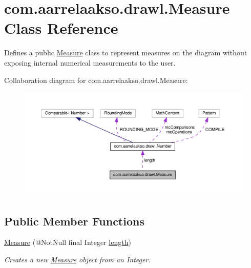 \hypertarget{classcom_1_1aarrelaakso_1_1drawl_1_1_measure}{}\section{com.\+aarrelaakso.\+drawl.\+Measure Class Reference}
\label{classcom_1_1aarrelaakso_1_1drawl_1_1_measure}


Defines a public \hyperlink{classcom_1_1aarrelaakso_1_1drawl_1_1_measure}{Measure} class to represent measures on the diagram without exposing internal numerical measurements to the user.  




Collaboration diagram for com.\+aarrelaakso.\+drawl.\+Measure\+:
\nopagebreak
\begin{figure}[H]
\begin{center}
\leavevmode
\includegraphics[width=350pt]{d5/ddb/classcom_1_1aarrelaakso_1_1drawl_1_1_measure__coll__graph}
\end{center}
\end{figure}
\subsection*{Public Member Functions}
\begin{DoxyCompactItemize}
\item 
\hyperlink{classcom_1_1aarrelaakso_1_1drawl_1_1_measure_a1960447b4b9dc0f4e71a2b86af31c52c}{Measure} (@Not\+Null final Integer \hyperlink{classcom_1_1aarrelaakso_1_1drawl_1_1_measure_aef040b9b0dd7d4a925448d0854c2444a}{length})
\begin{DoxyCompactList}\small\item\em Creates a new \hyperlink{classcom_1_1aarrelaakso_1_1drawl_1_1_measure}{Measure} object from an Integer. \end{DoxyCompactList}\end{DoxyCompactItemize}
